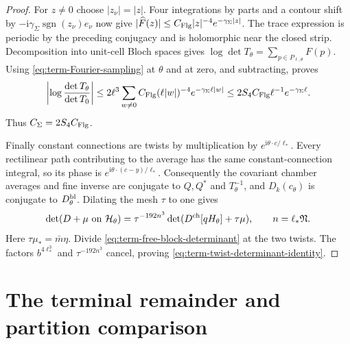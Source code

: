\documentclass[11pt,letterpaper,reqno]{amsart}
\begin{document}
\begin{proof}
For $z\ne0$ choose $|z_\nu|=|z|$.
Four integrations by parts and a contour shift by
$-\mathrm i\gamma_\Sigma\operatorname{sgn}(z_\nu)e_\nu$
now give
$|\widehat F(z)|\le C_{\rm Flg}|z|^{-4}
e^{-\gamma_\Sigma|z|}$.
The trace expression is periodic by the preceding
conjugacy and is holomorphic near the closed strip.
Decomposition into unit-cell Bloch spaces gives
$\log\det T_\theta=\sum_{p\in P_{\ell,\theta}}F(p)$.
Using \eqref{eq:term-Fourier-sampling} at $\theta$ and
at zero, and subtracting, proves
\[
 \left|\log\frac{\det T_\theta}{\det T_0}\right|
 \le2\ell^3\sum_{w\ne0}C_{\rm Flg}(\ell|w|)^{-4}
                                    e^{-\gamma_\Sigma\ell|w|}
 \le2S_4C_{\rm Flg}\ell^{-1}e^{-\gamma_\Sigma\ell}.
\]
Thus $C_\Sigma=2S_4C_{\rm Flg}$.

Finally constant connections are twists by multiplication
by $e^{\mathrm i\theta\cdot c/\ell_*}$.
Every rectilinear path contributing to the average has
the same constant-connection integral, so its phase is
$e^{\mathrm i\theta\cdot(c-y)/\ell_*}$.
Consequently the covariant chamber averages and fine
inverse are conjugate to $Q,Q^*$ and $T_\theta^{-1}$,
and $D_k(c_\theta)$ is conjugate to $D_\theta^{\rm bl}$.
Dilating the mesh $\tau$ to one gives
\[
 \det(D+\mu\text{ on }\mathcal H_\theta)
          =\tau^{-192n^3}\det(D^{\rm ch}[qH_\theta]+\tau\mu),
                \qquad n=\ell_*\mathfrak N .
\]
Here $\tau\mu_*=\bar m\eta$.
Divide \eqref{eq:term-free-block-determinant} at the two
twists. The factors $b^{4\ell_*^3}$ and
$\tau^{-192n^3}$ cancel, proving
\eqref{eq:term-twist-determinant-identity}.
\end{proof}

\section{The terminal remainder and partition comparison}
\label{subsec:term-remainder}
\end{document}

